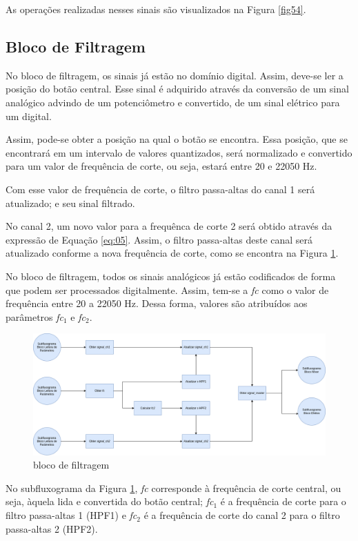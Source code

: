 As operações realizadas nesses sinais são visualizados na Figura \ref{fig54}.

\subsection{Bloco de Filtragem}

No bloco de filtragem, os sinais já estão no domínio digital. Assim, deve-se ler a posição do botão central. Esse sinal é adquirido através da conversão de um sinal analógico advindo de um potenciômetro e convertido, de um sinal elétrico para um digital. 

Assim, pode-se obter a posição na qual o botão se encontra. Essa posição, que se encontrará em um intervalo de valores quantizados, será normalizado e convertido para um valor de frequência de corte, ou seja, estará entre 20 e 22050 Hz.

Com esse valor de frequência de corte, o filtro passa-altas do canal 1 será atualizado; e seu sinal filtrado. 

No canal 2, um novo valor para a frequênca de corte 2 será obtido através da expressão de Equação \ref{eq:05}. Assim, o filtro passa-altas deste canal será atualizado conforme a nova frequência de corte, como se encontra na Figura \ref{fig55}. 

No bloco de filtragem, todos os sinais analógicos já estão codificados de forma que podem ser processados digitalmente. Assim, tem-se a \textit{fc} como o valor de frequência entre 20 a 22050 Hz. Dessa forma, valores são atribuídos aos parâmetros \textit{fc$_{1}$} e \textit{fc$_{2}$}.

\begin{figure}[h]
    \centering
    \includegraphics[width=\textwidth]{figuras/fig55.png}
    \caption{bloco de filtragem}
    \label{fig55}
\end{figure}

No subfluxograma da Figura \ref{fig55}, \textit{fc} corresponde à frequência de corte central, ou seja, àquela lida e convertida do botão central; \textit{fc$_{1}$} é a frequência de corte para o filtro passa-altas 1 (HPF1) e \textit{fc$_{2}$} é a frequência de corte do canal 2 para o filtro passa-altas 2 (HPF2).

